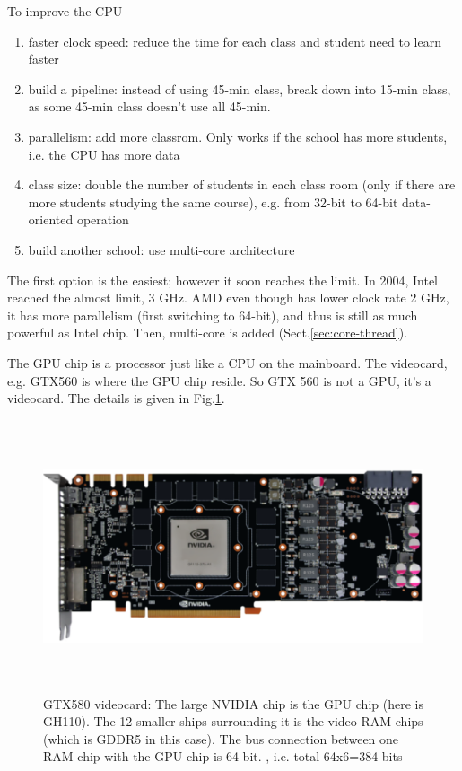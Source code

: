 \begin{mdframed}
To improve the CPU
\begin{enumerate}
  \item faster clock speed: reduce the time for each class and student need to
  learn faster
  
  \item build a pipeline: instead of using 45-min class, break down into 15-min
  class, as some 45-min class doesn't use all 45-min.
  
  \item parallelism: add more classrom. Only works if the school has more
  students, i.e. the CPU has more data
  
  \item class size: double the number of students in each class room (only if
  there are more students studying the same course), e.g.  from 32-bit to 64-bit
  data-oriented operation 

  
  \item build another school: use multi-core architecture
   
\end{enumerate}
The first option is the easiest; however it soon reaches the limit. In 2004,
Intel reached the almost limit, 3 GHz. AMD even though has lower clock rate 2
GHz, it has more parallelism (first switching to 64-bit), and thus is still as
much powerful as Intel chip.  Then, multi-core is added
(Sect.\ref{sec:core-thread}). 

\end{mdframed}

The GPU chip is a processor just like a CPU on the mainboard. The videocard,
e.g. GTX560 is where the GPU chip reside. So GTX 560 is not a GPU, it's a
videocard. The details is given in Fig.\ref{fig:GPU_videocard}.


\begin{figure}[hbt]
  \centerline{\includegraphics[height=8cm,
    angle=0]{./images/GPU_videocard.eps}}
\caption{GTX580 videocard: The large NVIDIA chip is the GPU chip (here is
GH110). The 12 smaller ships surrounding it is the video RAM chips (which is
GDDR5 in this case). The bus connection between one RAM chip with the
GPU chip is 64-bit. , i.e. total 64x6=384 bits}
\label{fig:GPU_videocard}
\end{figure}


